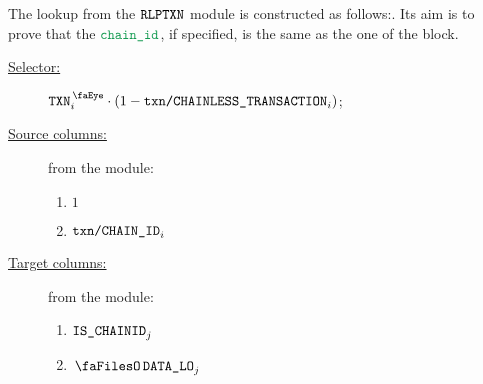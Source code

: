 The lookup from the $\texttt{RLPTXN}$ module is constructed as follows:. Its aim is to prove that the $\locChainId$, if specified, is the same as the one of the block.
\begin{description}
	\item[\underline{Selector:}] $\isTxn_{i} \cdot (1 - \rlpTxnTransactionColumnChainlessTransaction_{i})$;
	\item[\underline{Source columns:}] from the \rlpTxnMod{} module:
	\begin{multicols}{2}
	\begin{enumerate}
		\item $1$
		\item $\texttt{txn}\texttt{/}\texttt{{CHAIN\_ID}}_{i}$
	\end{enumerate}
	\end{multicols}
\item[\underline{Target columns:}] from the \btcMod{} module: 
	\begin{multicols}{2}
	\begin{enumerate}
		\item $\texttt{IS\_CHAINID}_{j}$
		\item $\blockDataLo_{j}$
	\end{enumerate} 
	\end{multicols}
\end{description}